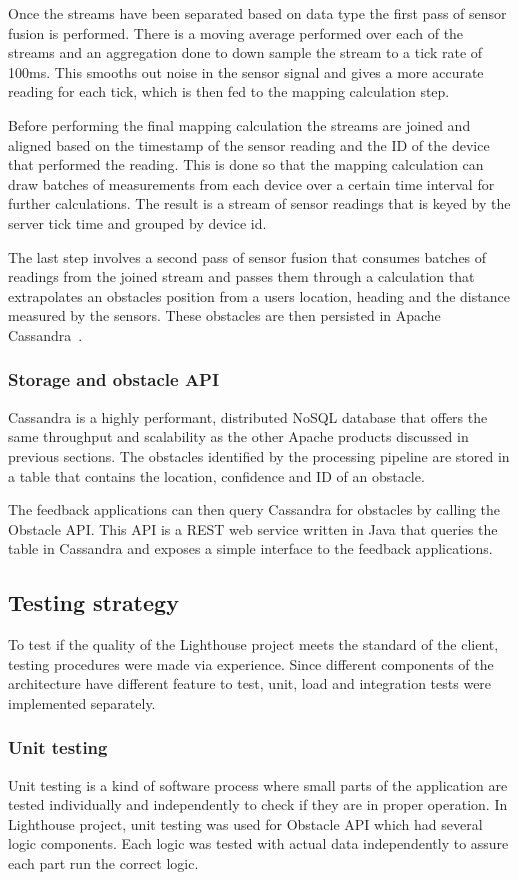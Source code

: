 \documentclass[prodmode,acmtosem]{acmsmall} %
\begin{document}
Once the streams have been separated based on data type the first pass of sensor fusion is performed. There is a moving average performed over each of the streams and an aggregation done to down sample the stream to a tick rate of 100ms. This smooths out noise in the sensor signal and gives a more accurate reading for each tick, which is then fed to the mapping calculation step.

Before performing the final mapping calculation the streams are joined and aligned based on the timestamp of the sensor reading and the ID of the device that performed the reading. This is done so that the mapping calculation can draw batches of measurements from each device over a certain time interval for further calculations. The result is a stream of sensor readings that is keyed by the server tick time and grouped by device id.

The last step involves a second pass of sensor fusion that consumes batches of readings from the joined stream and passes them through a calculation that extrapolates an obstacles position from a users location, heading and the distance measured by the sensors. These obstacles are then persisted in Apache Cassandra~\cite{ApacheCassandra}.

\subsubsection{Storage and obstacle API}
Cassandra is a highly performant, distributed NoSQL database that offers the same throughput and scalability as the other Apache products discussed in previous sections. The obstacles identified by the processing pipeline are stored in a table that contains the location, confidence and ID of an obstacle.

The feedback applications can then query Cassandra for obstacles by calling the Obstacle API. This API is a REST web service written in Java that queries the table in Cassandra and exposes a simple interface to the feedback applications.
\subsection{Testing strategy}
To test if the quality of the Lighthouse project meets the standard of the client, testing procedures were made via experience. Since different components of the architecture have different feature to test, unit, load and integration tests were implemented separately.

\subsubsection{Unit testing}
Unit testing is a kind of software process where small parts of the application are tested individually and independently to check if they are in proper operation.\cite{cheon2002simple} In Lighthouse project, unit testing was used for Obstacle API which had several logic components. Each logic was tested with actual data independently to assure each part run the correct logic.
\end{document}
